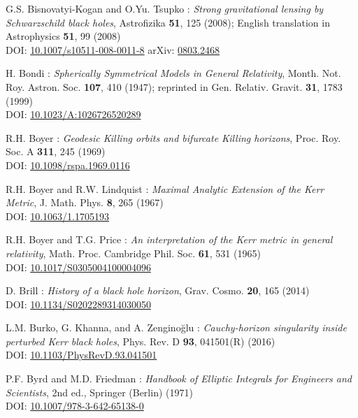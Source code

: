 \begin{thebibliography}{123}
G.S. Bisnovatyi-Kogan and O.Yu. Tsupko :
{\em Strong gravitational lensing by Schwarzschild black holes},
Astrofizika {\bf 51}, 125 (2008); English translation in
Astrophysics {\bf 51}, 99 (2008)\\
DOI: \href{https://doi.org/10.1007/s10511-008-0011-8}{10.1007/s10511-008-0011-8}\hfill
arXiv: \href{https://arxiv.org/abs/0803.2468}{0803.2468}

H. Bondi :
{\em Spherically Symmetrical Models in General Relativity},
Month. Not. Roy. Astron. Soc. {\bf 107}, 410 (1947);
reprinted in
Gen. Relativ. Gravit. {\bf 31}, 1783 (1999)\\
DOI: \href{https://doi.org/10.1023/10.1023/A:1026726520289}{10.1023/A:1026726520289}

R.H. Boyer : {\em Geodesic Killing orbits and bifurcate Killing horizons},
Proc. Roy. Soc. A {\bf 311}, 245 (1969)\\
DOI: \href{https://doi.org/10.1098/rspa.1969.0116}{10.1098/rspa.1969.0116}

R.H. Boyer and R.W. Lindquist : {\em Maximal Analytic Extension of the Kerr Metric},
J. Math. Phys. {\bf 8}, 265 (1967)\\
DOI: \href{https://doi.org/10.1063/1.1705193}{10.1063/1.1705193}

R.H. Boyer and T.G. Price : {\em An interpretation of the Kerr metric in general relativity},
Math. Proc. Cambridge Phil. Soc. {\bf 61}, 531 (1965)\\
DOI: \href{https://doi.org/10.1017/S0305004100004096}{10.1017/S0305004100004096}

D. Brill : {\em History of a black hole horizon},
Grav. Cosmo. {\bf 20}, 165 (2014) \\
DOI: \href{https://doi.org/10.1134/S0202289314030050}{10.1134/S0202289314030050}

L.M. Burko, G. Khanna, and A. Zenginoğlu : {\em
Cauchy-horizon singularity inside perturbed Kerr black holes},
Phys. Rev. D {\bf 93}, 041501(R) (2016) \\
DOI: \href{https://doi.org/10.1103/PhysRevD.93.041501}{10.1103/PhysRevD.93.041501}

P.F. Byrd and M.D. Friedman :
{\em Handbook of Elliptic Integrals for Engineers and Scientists},
2nd ed., Springer (Berlin) (1971)\\
DOI: \href{https://doi.org/10.1007/978-3-642-65138-0}{10.1007/978-3-642-65138-0}


\end{thebibliography}
